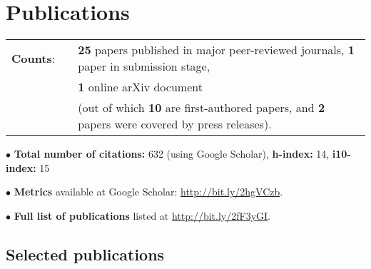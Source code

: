 \documentclass[11pt,letterpaper,sans]{moderncv}
\begin{document}
\vspace{-3mm}
\section{Publications}

\cvitem{}
{
\begin{tabular}{rcl}
\textbf{Counts}: &\hspace{0.3cm} &{\textbf{25} papers published in major peer-reviewed journals}, {\textbf{1} paper in submission stage,} \\
& &{\textbf{1} online arXiv document} \\
& &{(out of which \textbf{10} are first-authored papers, and \textbf{2} papers were covered by press releases).}
\end{tabular}
}

$\bullet$ \textbf{Total number of citations:} 632 (using Google Scholar), \textbf{h-index:} 14, \textbf{i10-index:} 15

$\bullet$ \textbf{Metrics} available at Google Scholar: {\color{color1} \href{http://bit.ly/2hgVCzb}{http://bit.ly/2hgVCzb}}.

$\bullet$ \textbf{Full list of publications} listed at {\color{color1} \href{http://bit.ly/2fF3yGI}{http://bit.ly/2fF3yGI}}.

\subsection{Selected publications}
\end{document}
